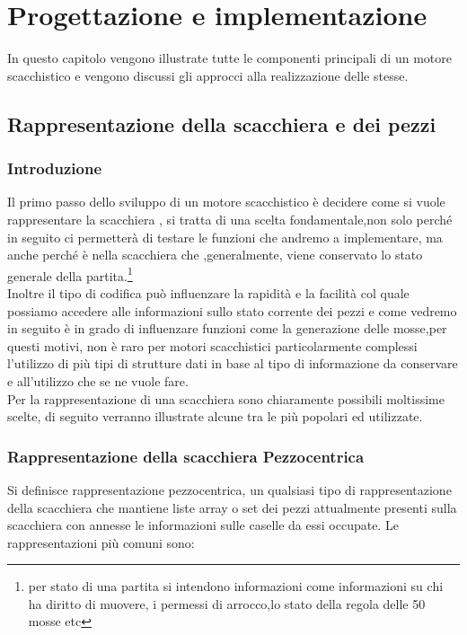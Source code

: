 \chapter{Progettazione e implementazione}
%

\begin{citazione}
    In questo capitolo vengono illustrate tutte le componenti principali di un motore scacchistico e vengono discussi gli approcci alla realizzazione delle stesse.
\end{citazione}

\newpage
\section{Rappresentazione della scacchiera e dei pezzi}

\subsection{Introduzione} %
Il primo passo dello sviluppo di un motore scacchistico è decidere come si vuole rappresentare
la scacchiera , si tratta di una scelta fondamentale,non solo perché in seguito ci permetterà
di testare le funzioni che andremo a implementare, ma anche perché è nella scacchiera che ,generalmente,
viene conservato lo stato generale della partita.\footnote{per stato di una partita si intendono informazioni come
    informazioni su chi ha diritto di muovere, i permessi di arrocco,lo stato della regola delle 50 mosse etc}
\\Inoltre il tipo di codifica può influenzare la rapidità
e la facilità col quale possiamo accedere alle informazioni sullo stato corrente dei pezzi
e come vedremo in seguito è in grado di influenzare funzioni come la generazione delle mosse,per questi motivi,
non è raro per motori scacchistici particolarmente complessi l'utilizzo di più tipi di strutture dati in base
al tipo di informazione da conservare e all'utilizzo che se ne vuole fare.
\\Per la rappresentazione di una scacchiera sono chiaramente possibili moltissime scelte, di seguito
verranno illustrate alcune tra le più popolari ed utilizzate.

\subsection{Rappresentazione della scacchiera Pezzocentrica}
Si definisce rappresentazione pezzocentrica, un qualsiasi tipo di rappresentazione della scacchiera che mantiene liste
array o set dei pezzi attualmente presenti sulla scacchiera con annesse le informazioni sulle caselle da essi occupate.
Le rappresentazioni più comuni sono:
